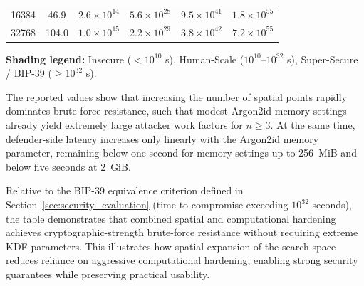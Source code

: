 \documentclass[journal,article,accept,pdftex,moreauthors]{Definitions/mdpi}
\begin{document}
\begin{table}[H]
\begin{tabular}{rccccc}
\midrule
16384 & 46.9 &
\cellcolor{humanscale}$2.6\times10^{14}$ &
\cellcolor{humanscale}$5.6\times10^{28}$ &
\cellcolor{supersecure}$9.5\times10^{41}$ &
\cellcolor{supersecure}$1.8\times10^{55}$ \\

32768 & 104.0 &
\cellcolor{humanscale}$1.0\times10^{15}$ &
\cellcolor{humanscale}$2.2\times10^{29}$ &
\cellcolor{supersecure}$3.8\times10^{42}$ &
\cellcolor{supersecure}$7.2\times10^{55}$ \\
\bottomrule
\end{tabular}

\vspace{0.5em}
\footnotesize
\textbf{Shading legend:}
 Insecure ($<10^{10}$ s),
 Human-Scale ($10^{10}$–$10^{32}$ s),
 Super-Secure / BIP-39 ($\ge 10^{32}$ s).
\end{table}


The reported values show that increasing the number of spatial points rapidly dominates brute-force resistance, such that modest Argon2id memory settings already yield extremely large attacker work factors for $n \ge 3$. At the same time, defender-side latency increases only linearly with the Argon2id memory parameter, remaining below one second for memory settings up to 256~MiB and below five seconds at 2~GiB.

Relative to the BIP-39 equivalence criterion defined in Section~\ref{sec:security_evaluation} (time-to-compromise exceeding $10^{32}$ seconds), the table demonstrates that combined spatial and computational hardening achieves cryptographic-strength brute-force resistance without requiring extreme KDF parameters. This illustrates how spatial expansion of the search space reduces reliance on aggressive computational hardening, enabling strong security guarantees while preserving practical usability.
\end{document}
